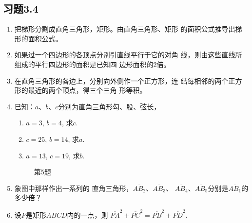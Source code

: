 \subsection*{习题3.4}
\begin{enumerate}
    \item 把梯形分割成直角三角形，矩形。由直角三角形、矩形
    的面积公式推导出梯形的面积公式。
    \item 如果过一个四边形的各顶点分别引直线平行于它的对角
    线，则由这些直线所组成的平行四边形的面积是已知四
    边形面积的2倍。
    \item 在直角三角形的各边上，分别向外侧作一个正方形，连
    结每相邻的两个正方形的最近的两个顶点，得三个三角
    形等积。
    \item 已知：$a$、$b$、$c$分别为直角三角形勾、股、弦长，
    \begin{enumerate}
        \item $a=3$, $b=4$, 求$c$.
        \item $c=25$, $b=14$, 求$a$.
     \item $a=13$, $c=19$, 求$b$.
    \end{enumerate}

    \begin{figure}[htp]
    \centering
{}    
    \caption*{第5题}
\end{figure}

\item 象图中那样作出一系列的
直角三角形，$\overline{AB_2}$、$\overline{AB_3}$、
$\overline{AB_4}$、$\overline{AB_5}$分别是$\overline{AB_1}$的
多少倍？
\item 设$P$是矩形$ABCD$内的一点，则
$\overline{PA}^2+\overline{PC}^2=\overline{PB}^2+\overline{PD}^2$.


\end{enumerate}
